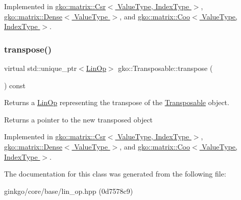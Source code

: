 Implemented in \hyperlink{classgko_1_1matrix_1_1Csr_a38820451af5424f18b767667f3067d72}{gko\+::matrix\+::\+Csr$<$ Value\+Type, Index\+Type $>$}, \hyperlink{classgko_1_1matrix_1_1Dense_a19890b1448497a50d57c16ed4c3bd820}{gko\+::matrix\+::\+Dense$<$ Value\+Type $>$}, and \hyperlink{classgko_1_1matrix_1_1Coo_ac1d91c524ca616b4c9e5f2a62f3f55ce}{gko\+::matrix\+::\+Coo$<$ Value\+Type, Index\+Type $>$}.

\mbox{\label{classgko_1_1Transposable_a5c6b778b71b47d53e0bda6ccf894d318}} 
\subsubsection{\texorpdfstring{transpose()}{transpose()}}
{\footnotesize\ttfamily virtual std\+::unique\+\_\+ptr$<$\hyperlink{classgko_1_1LinOp}{Lin\+Op}$>$ gko\+::\+Transposable\+::transpose (\begin{DoxyParamCaption}{ }\end{DoxyParamCaption}) const\hspace{0.3cm}{\ttfamily [pure virtual]}}



Returns a \hyperlink{classgko_1_1LinOp}{Lin\+Op} representing the transpose of the \hyperlink{classgko_1_1Transposable}{Transposable} object. 

\begin{DoxyReturn}{Returns}
a pointer to the new transposed object 
\end{DoxyReturn}


Implemented in \hyperlink{classgko_1_1matrix_1_1Csr_ab79e609214d6b4834d5961ee0a7d3519}{gko\+::matrix\+::\+Csr$<$ Value\+Type, Index\+Type $>$}, \hyperlink{classgko_1_1matrix_1_1Dense_a64ea8e876f5390a535a2ef486bd5ab9a}{gko\+::matrix\+::\+Dense$<$ Value\+Type $>$}, and \hyperlink{classgko_1_1matrix_1_1Coo_ae6533c08c7f818d3bdd80b2871784dab}{gko\+::matrix\+::\+Coo$<$ Value\+Type, Index\+Type $>$}.



The documentation for this class was generated from the following file\+:\begin{DoxyCompactItemize}
\item 
ginkgo/core/base/lin\+\_\+op.\+hpp (0d7578c9)\end{DoxyCompactItemize}
